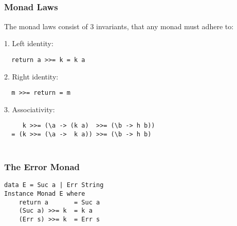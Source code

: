 \documentclass{beamer}
\newcommand{\bind}{\texttt{>>=}}
\newcommand{\ret}{\texttt{return}}
\newcommand{\bs}{\texttt{\char`\\}}
\newcommand{\at}{\texttt{a}}
\newcommand{\mt}{\texttt{k}}
\begin{document}
\subsection{}
\begin{frame}[fragile]
 \frametitle{Monad Laws}
The monad laws consist of 3 invariants, that any monad must adhere to:

1. Left identity:
\begin{lstlisting}
  return a >>= k = k a
\end{lstlisting}

2. Right identity:
\begin{lstlisting}
  m >>= return = m
\end{lstlisting}

3. Associativity:
\begin{lstlisting}
     k >>= (\a -> (k a)  >>= (\b -> h b)) 
  = (k >>= (\a ->  k a)) >>= (\b -> h b)
\end{lstlisting}
\begin{align*}
\end{align*}
\end{frame}
\begin{frame}[fragile]
\frametitle{The Error Monad}
\begin{lstlisting}
data E = Suc a | Err String
Instance Monad E where
    return a       = Suc a     
    (Suc a) >>= k  = k a
    (Err s) >>= k  = Err s
\end{lstlisting}
\end{frame}
\end{document}
